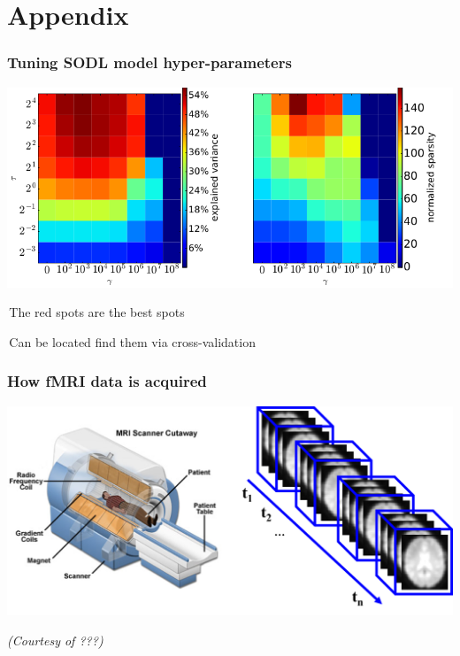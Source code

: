 \documentclass{beamer}
\def\mydot{\structure{\rule{1ex}{1ex}}\,}
\begin{document}
\section{Appendix}
\begin{frame}
  \frametitle{{Tuning SODL model hyper-parameters}}%
  \includegraphics[width=1.\linewidth]{cv.png}
  \bigskip
  
  \mydot{The red spots are the best spots}

  \bigskip
  
  \mydot{Can be located find them via cross-validation}
\end{frame}

\begin{frame}\frametitle{How fMRI data is acquired}
    \centering
    \includegraphics[scale=.4]{fmri_setup}

\tiny{\textit{(Courtesy of ???)}}
\end{frame}
\end{document}
